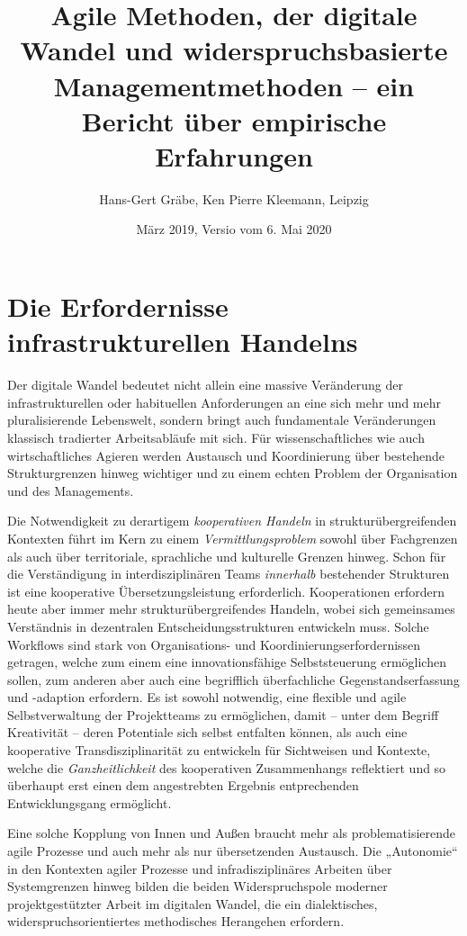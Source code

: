 \documentclass[a4paper,11pt]{article}
\title{Agile Methoden, der digitale Wandel und widerspruchsbasierte
  Managementmethoden – ein Bericht über empirische Erfahrungen}
\author{Hans-Gert Gräbe, Ken Pierre Kleemann, Leipzig}
\date{März 2019, Versio  vom 6. Mai 2020}
\begin{document}
\maketitle

\section*{Die Erfordernisse infrastrukturellen Handelns}

Der digitale Wandel bedeutet nicht allein eine massive Veränderung der
infrastrukturellen oder habituellen Anforderungen an eine sich mehr und mehr
pluralisierende Lebenswelt, sondern bringt auch fundamentale Veränderungen
klassisch tradierter Arbeitsabläufe mit sich. Für wissenschaftliches wie auch
wirtschaftliches Agieren werden Austausch und Koordinierung über bestehende
Strukturgrenzen hinweg wichtiger und zu einem echten Problem der Organisation
und des Managements.

Die Notwendigkeit zu derartigem \emph{kooperativen Handeln} in
strukturübergreifenden Kontexten führt im Kern zu einem
\emph{Vermittlungsproblem} sowohl über Fachgrenzen als auch über territoriale,
sprachliche und kulturelle Grenzen hinweg. Schon für die Verständigung in
interdisziplinären Teams \emph{innerhalb} bestehender Strukturen ist eine
kooperative Übersetzungsleistung erforderlich.  Kooperationen erfordern heute
aber immer mehr strukturübergreifendes Handeln, wobei sich gemeinsames
Verständnis in dezentralen Entscheidungsstrukturen entwickeln muss. Solche
Workflows sind stark von Organisations- und Koordinierungserfordernissen
getragen, welche zum einem eine innovationsfähige Selbststeuerung ermöglichen
sollen, zum anderen aber auch eine begrifflich überfachliche
Gegenstandserfassung und -adaption erfordern. Es ist sowohl notwendig, eine
flexible und agile Selbstverwaltung der Projektteams zu ermöglichen, damit –
unter dem Begriff Kreativität – deren Potentiale sich selbst entfalten können,
als auch eine kooperative Transdisziplinarität zu entwickeln für Sichtweisen
und Kontexte, welche die \emph{Ganzheitlichkeit} des kooperativen
Zusammenhangs reflektiert und so überhaupt erst einen dem angestrebten
Ergebnis entprechenden Entwicklungsgang ermöglicht.

Eine solche Kopplung von Innen und Außen braucht mehr als problematisierende
agile Prozesse und auch mehr als nur übersetzenden Austausch. Die „Autonomie“
in den Kontexten agiler Prozesse und infradisziplinäres Arbeiten über
Systemgrenzen hinweg bilden die beiden Widerspruchspole moderner
projektgestützter Arbeit im digitalen Wandel, die ein dialektisches,
widerspruchsorientiertes methodisches Herangehen erfordern.
\end{document}
